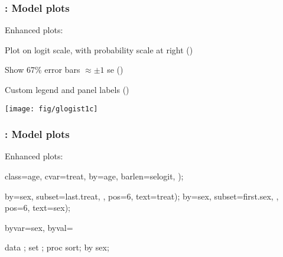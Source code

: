 \begin{frame}
  \frametitle{: Model plots}
Enhanced plots:

  \begin{itemize*}
	\item Plot on logit scale, with probability scale at right ()
	\item Show 67\% error bars $\approx \pm 1$ se ()
	\item Custom legend and panel labels ()
  \end{itemize*}

 \begin{center}
  \texttt{[image: fig/glogist1c]}
 \end{center}

\end{frame}

\begin{frame}[fragile]
  \frametitle{: Model plots}
Enhanced plots:

\begin{Input}[fontsize=\footnotesize,label=\fbox{$\cdots$ \texttt{glogist1c.sas} $\cdots$},baselinestretch=0.7,firstnumber=9]
   class=age, cvar=treat, by=age,
   barlen=selogit, );

   by=sex, subset=last.treat, , pos=6, text=treat);
   by=sex, subset=first.sex, , pos=6, text=sex);

   byvar=sex, byval=%

data ;
   set ;
proc sort;
   by sex;
\end{Input}
\end{frame}

